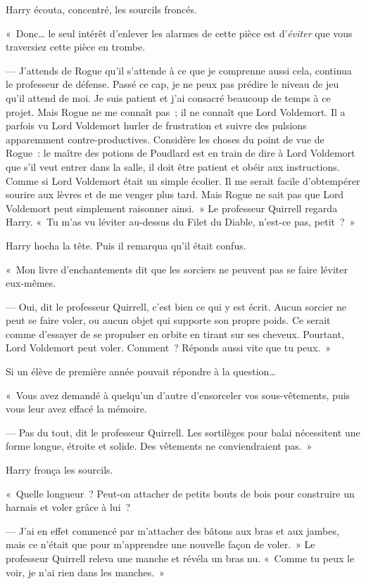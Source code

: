 Harry écouta, concentré, les sourcils froncés.

«~Donc… le seul intérêt d'enlever les alarmes de cette pièce est d'\emph{éviter} que vous traversiez cette pièce en trombe.

--- J'attends de Rogue qu'il s'attende à ce que je comprenne aussi cela, continua le professeur de défense. Passé ce cap, je ne peux pas prédire le niveau de jeu qu'il attend de moi. Je suis patient et j'ai consacré beaucoup de temps à ce projet. Mais Rogue ne me connaît pas~; il ne connaît que Lord Voldemort. Il a parfois vu Lord Voldemort hurler de frustration et suivre des pulsions apparemment contre-productives. Considère les choses du point de vue de Rogue~: le maître des potions de Poudlard est en train de dire à Lord Voldemort que s'il veut entrer dans la salle, il doit être patient et obéir aux instructions. Comme si Lord Voldemort était un simple écolier. Il me serait facile d'obtempérer sourire aux lèvres et de me venger plus tard. Mais Rogue ne sait pas que Lord Voldemort peut simplement raisonner ainsi.~» Le professeur Quirrell regarda Harry. «~Tu m'as vu léviter au-dessus du Filet du Diable, n'est-ce pas, petit~?~»

Harry hocha la tête. Puis il remarqua qu'il était confus.

«~Mon livre d'enchantements dit que les sorciers ne peuvent pas se faire léviter eux-mêmes.

--- Oui, dit le professeur Quirrell, c'est bien ce qui y est écrit. Aucun sorcier ne peut se faire voler, ou aucun objet qui supporte son propre poids. Ce serait comme d'essayer de se propulser en orbite en tirant sur ses cheveux. Pourtant, Lord Voldemort peut voler. Comment~? Réponds aussi vite que tu peux.~»

Si un élève de première année pouvait répondre à la question…

«~Vous avez demandé à quelqu'un d'autre d'ensorceler vos sous-vêtements, puis vous leur avez effacé la mémoire.

--- Pas du tout, dit le professeur Quirrell. Les sortilèges pour balai nécessitent une forme longue, étroite et solide. Des vêtements ne conviendraient pas.~»

Harry fronça les sourcils.

«~Quelle longueur~? Peut-on attacher de petits bouts de bois pour construire un harnais et voler grâce à lui~?

--- J'ai en effet commencé par m'attacher des bâtons aux bras et aux jambes, mais ce n'était que pour m'apprendre une nouvelle façon de voler.~» Le professeur Quirrell releva une manche et révéla un bras nu. «~Comme tu peux le voir, je n'ai rien dans les manches.~»

